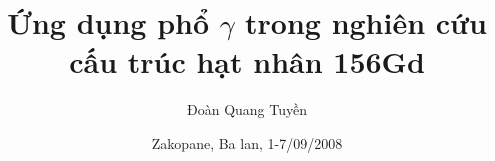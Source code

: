 \usepackage[T1, T2A,T2B,T2C,T5]{fontenc}
\usepackage[utf8]{inputenc}
\usepackage[english, french, russian, main = vietnamese]{babel}

\usepackage{amssymb, amsthm}
\usepackage[intlimits]{mathtools}

\usepackage{graphicx}

\usepackage{tikz}
\usetikzlibrary{trees, backgrounds, arrows, shapes, shadows, calc, fpu}

\newlength\picH
\newlength\picW
\newlength\picL
\newlength\pit



\title[Cấu trúc hạt nhân 156Gd]{Ứng dụng phổ $\gamma$ trong nghiên cứu cấu trúc hạt nhân 156Gd}
\author[D.Q. Tuyền]{Đoàn Quang Tuyền}
\date[Zakopane, 2008]{Zakopane, Ba lan, 1-7/09/2008} 









\usepackage{listings} 




